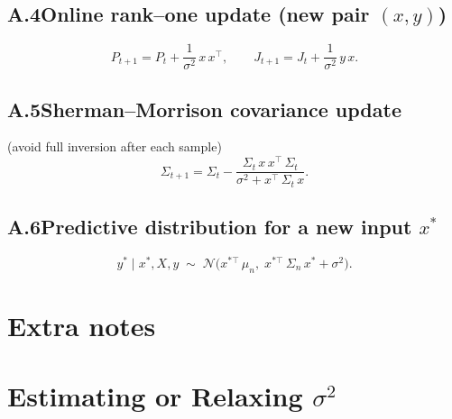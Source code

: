 \documentclass[11pt]{article}
\begin{document}
\subsection*{A.4\quad Online rank–one update (new pair \((x,y)\))}
\begin{equation}\tag{A.5}
P_{t+1} = P_t + \frac1{\sigma^2}\,x\,x^\top,
\qquad
J_{t+1} = J_t + \frac1{\sigma^2}\,y\,x.
\end{equation}

\subsection*{A.5\quad Sherman–Morrison covariance update}
(avoid full inversion after each sample)
\begin{equation}\tag{A.6}
\Sigma_{t+1}
= \Sigma_t
- \frac{\Sigma_t\,x\,x^\top\,\Sigma_t}
       {\sigma^2 + x^\top\,\Sigma_t\,x}.
\end{equation}

\subsection*{A.6\quad Predictive distribution for a new input \(x^*\)}
\begin{equation}\tag{A.7}
y^* \mid x^*,X,y
\;\sim\;
\mathcal{N}\bigl(x^{*\top}\,\mu_n,\;x^{*\top}\,\Sigma_n\,x^* + \sigma^2\bigr).
\end{equation}


\section{Extra notes}

\section{Estimating or Relaxing \(\sigma^2\)}
\end{document}
